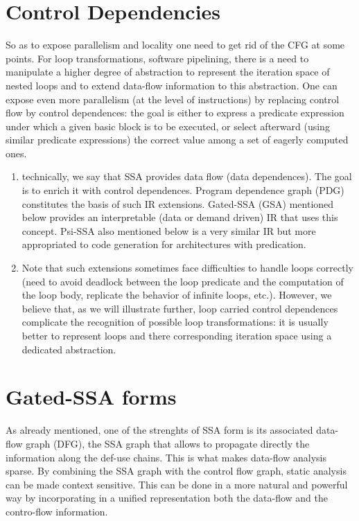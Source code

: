 \section{Control Dependencies}
So as to expose parallelism and locality one need to get rid of the CFG at some points. 
For loop transformations, software pipelining, there is a need to manipulate a higher degree of abstraction to represent the iteration space of nested loops and to extend data-flow information to this abstraction. 
One can expose even more parallelism (at the level of instructions) by replacing control flow by control dependences: 
the goal is either to express a predicate expression under which a given basic block is to be executed, or select afterward (using similar predicate expressions) the correct value among a set of eagerly computed ones.
\begin{enumerate}
\item technically, we say that SSA provides data flow (data dependences). 
  The goal is to enrich it with control dependences. 
  Program dependence graph (PDG) constitutes the basis of such IR extensions. 
  Gated-SSA (GSA) mentioned below provides an interpretable (data or demand driven) IR that uses this concept. 
  Psi-SSA also mentioned below is a very similar IR but more appropriated to code generation for architectures with predication. 
\item Note that such extensions sometimes face difficulties to handle loops correctly (need to avoid deadlock between the loop predicate and the computation of the loop body, replicate the behavior of infinite loops, etc.). 
  However, we believe that, as we will illustrate further, loop carried control dependences complicate the recognition of possible loop transformations: 
  it is usually better to represent loops and there corresponding iteration space using a dedicated abstraction.
\end{enumerate}

\section{Gated-SSA forms}
As already mentioned, one of the strenghts of SSA form is its associated data-flow graph (DFG), the SSA graph that allows to propagate directly the information along the def-use chains.
This is what makes data-flow analysis sparse.
By combining the SSA graph with the control flow graph, static analysis can be made context sensitive.
This can be done in a more natural and powerful way by incorporating in a unified representation both the data-flow and the contro-flow information.

